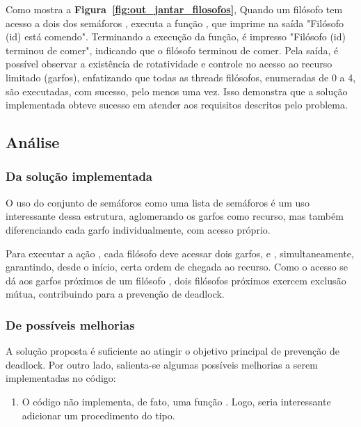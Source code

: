\documentclass[
	12pt,				%
	openright,			%
	oneside,			%
	a4paper,			%
	chapter=TITLE,		%
	english,			%
	french,				%
	spanish,			%
	brazil				%
	]{abntex2}
\theoremstyle{definition}
\begin{document}
Como mostra a \textbf{Figura~\ref{fig:out_jantar_filosofos}}, Quando um filósofo tem acesso a dois dos semáforos , executa a função , que imprime na saída "Filósofo (id) está comendo". Terminando a execução da função, é impresso "Filósofo (id) terminou de comer", indicando que o filósofo terminou de comer. Pela saída, é possível observar a existência de rotatividade e controle no acesso ao recurso limitado (garfos), enfatizando que todas as threads filósofos, enumeradas de 0 a 4, são executadas, com sucesso, pelo menos uma vez. Isso demonstra que a solução implementada obteve sucesso em atender aos requisitos descritos pelo problema.

\subsection{Análise}
\subsubsection{Da solução implementada}
O uso do conjunto de semáforos  como uma lista de semáforos é um uso interessante dessa estrutura, aglomerando os garfos como recurso, mas também diferenciando cada garfo individualmente, com acesso próprio. 

Para executar a ação , cada filósofo deve acessar dois garfos,  e , simultaneamente, garantindo, desde o início, certa ordem de chegada ao recurso. Como o acesso se dá aos garfos próximos de um filósofo  , dois filósofos próximos exercem exclusão mútua, contribuindo para a prevenção de deadlock.

\subsubsection{De possíveis melhorias}

A solução proposta é suficiente ao atingir o objetivo principal de prevenção de deadlock. Por outro lado, salienta-se algumas possíveis melhorias a serem implementadas no código:
\begin{enumerate}
    \item O código não implementa, de fato, uma função . Logo, seria interessante adicionar um procedimento do tipo. 
\end{enumerate}

\clearpage
\end{document}
